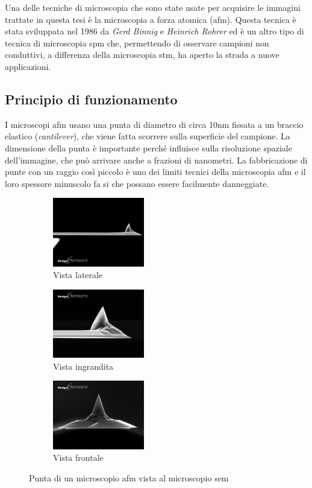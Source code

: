\documentclass[../main.tex]{subfiles}
\begin{document}
Una delle tecniche di microscopia che sono state usate per acquisire le immagini trattate in questa tesi è la microscopia a forza atomica (\acrshort{afm}). Questa tecnica è stata sviluppata nel 1986 da \textit{Gerd Binnig} e \textit{Heinrich Rohrer} ed è un altro tipo di tecnica di microscopia \acrshort{spm} che, permettendo di osservare campioni non conduttivi, a differenza della microscopia \acrshort{stm}, ha aperto la strada a nuove applicazioni.\cite{binnig_1986}

\subsection{Principio di funzionamento}

I microscopi \acrshort{afm} usano una punta di diametro di circa 10nm fissata a un braccio elastico (\textit{cantilever}), che viene fatta scorrere sulla superficie del campione. La dimensione della punta è importante perché influisce sulla risoluzione spaziale dell'immagine, che può arrivare anche a frazioni di nanometri. La fabbricazione di punte con un raggio così piccolo è uno dei limiti tecnici della microscopia \acrshort{afm} e il loro spessore minuscolo fa si che possano essere facilmente danneggiate.\\

\begin{figure}[H]
	\centering
	\begin{subfigure}{4cm}
		\includegraphics[width=4cm]{images/afm_tip.png}
		\caption{Vista laterale}
	\end{subfigure}
	\hfill
	\begin{subfigure}{4cm}
		\includegraphics[width=4cm]{images/afm_tip_zoom.png}
		\caption{Vista ingrandita}
	\end{subfigure}
	\hfill
	\begin{subfigure}{4cm}
		\includegraphics[width=4cm]{images/afm_tip_front.png}
		\caption{Vista frontale}
	\end{subfigure}
\caption{Punta di un microscopio \acrshort{afm} vista al microscopio \acrshort{sem}\ \cite{budgetsensors} }
\label{fig:afm_tip}
\end{figure}
\end{document}
